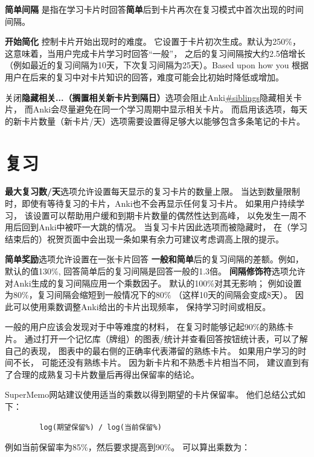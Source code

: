 \documentclass[a4paper]{book}
\begin{document}
	\textbf{简单间隔} 是指在学习卡片时回答\textbf{简单}后到卡片再次在复习模式中首次出现的时间间隔。
	
	\textbf{开始简化} 控制卡片开始出现时的难度。 它设置于卡片初次生成。默认为250\%， 这意味着，当用户完成卡片学习时回答“一般”， 之后的复习间隔按大约2.5倍增长 （例如最近的复习间隔为10天，下次复习间隔为25天）。Based upon how you 根据用户在后来的复习中对卡片知识的回答，难度可能会比初始时降低或增加。
	
	关闭\textbf{隐藏相关...（搁置相关新卡片到隔日）}选项会阻止Anki\url{#siblings}隐藏相关卡片， 而Anki会尽量避免在同一个学习周期中显示相关卡片。 而启用该选项，每天的新卡片数量（新卡片/天）选项需要设置得足够大以能够包含多条笔记的卡片。
	
	\section{复习}\label{reviewingahead}
	\textbf{最大复习数/天}选项允许设置每天显示的复习卡片的数量上限。 当达到数量限制时，即使有等待复习的卡片，Anki也不会再显示任何复习卡片。 如果用户持续学习， 该设置可以帮助用户缓和到期卡片数量的偶然性达到高峰， 以免发生一周不用后回到Anki中被吓一大跳的情况。 当复习卡片因此选项而被隐藏时， 在（学习结束后的）祝贺页面中会出现一条如果有余力可建议考虑调高上限的提示。
	
	\textbf{简单奖励}选项允许设置在一张卡片回答
	\textbf{一般和简单}后的复习间隔的差额。例如，默认的值130\%, 回答简单后的复习间隔是回答一般的1.3倍。
	\textbf{间隔修饰符}选项允许对Anki生成的复习间隔应用一个乘数因子。 默认的100\%对其无影响； 例如设置为80\%，复习间隔会缩短到一般情况下的80\% （这样10天的间隔会变成8天）。 因此可以使用乘数调整Anki给出的卡片出现频率， 保持学习时间或相反。
	
	一般的用户应该会发现对于中等难度的材料， 在复习时能够记起90\%的熟练卡片。 通过打开一个记忆库（牌组）的图表/统计并查看回答按钮统计表，可以了解自己的表现， 图表中的最右侧的正确率代表滞留的熟练卡片。 如果用户学习的时间不长， 可能还没有熟练卡片。 因为新卡片和不熟悉卡片相当不同， 建议直到有了合理的成熟复习卡片数量后再得出保留率的结论。
	
	SuperMemo网站建议使用适当的乘数以得到期望的卡片保留率。 他们总结公式如下：
	
	\begin{shaded}\begin{verbatim}
		log(期望保留%) / log(当前保留%)
		\end{verbatim}\end{shaded}
	例如当前保留率为85\%，然后要求提高到90\%。 可以算出乘数为：
	
\end{document}
